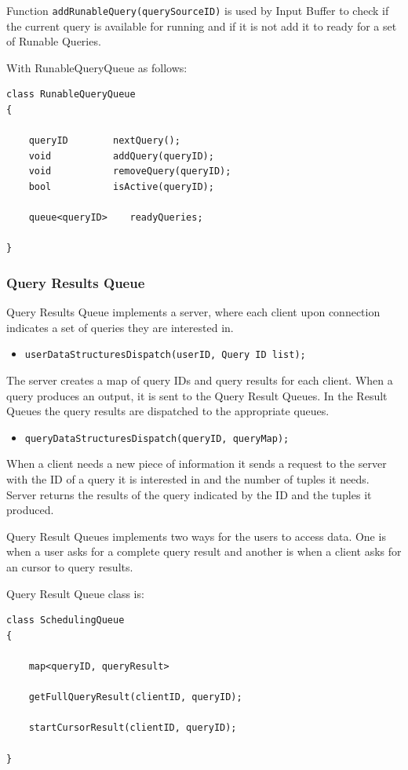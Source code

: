 \documentclass[11pt]{article}
\begin{document}
Function {\tt addRunableQuery(querySourceID)} is used by Input Buffer to check if the current query is available for running and if it is not add it to ready for a set of Runable Queries.

\noindent With RunableQueryQueue as follows:

\begin{verbatim}
class RunableQueryQueue
{
    
    queryID        nextQuery();
    void           addQuery(queryID);
    void           removeQuery(queryID);
    bool           isActive(queryID);

    queue<queryID>    readyQueries;
	
}
\end{verbatim}


\subsubsection{Query Results Queue}

Query Results Queue implements a server, where each client upon connection indicates a set of queries they are interested in.

\begin{itemize}
	\item {\tt userDataStructuresDispatch(userID, Query ID list);}
\end{itemize}

\noindent The server creates a map of query IDs and query results for each client. When a query produces an output, it is sent to the Query Result Queues. In the Result Queues the query results are dispatched to the appropriate queues.

\begin{itemize}
	\item {\tt queryDataStructuresDispatch(queryID, queryMap);}
\end{itemize}

\noindent When a client needs a new piece of information it sends a request to the server with the ID of a query it is interested in and the number of tuples it needs. Server returns the results of the query indicated by the ID and the tuples it produced. 

Query Result Queues implements two ways for the users to access data. One is when a user asks for a complete query result and another is when a client asks for an cursor to query results.

Query Result Queue class is:

\begin{verbatim}
class SchedulingQueue
{
    
	map<queryID, queryResult>
	
	getFullQueryResult(clientID, queryID);
	
	startCursorResult(clientID, queryID);
	
}
\end{verbatim}
\end{document}
